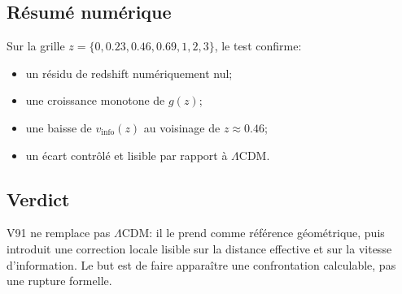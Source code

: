 \subsection{Résumé numérique}
Sur la grille $z=\{0,0.23,0.46,0.69,1,2,3\}$, le test confirme:
\begin{itemize}
    \item un résidu de redshift numériquement nul;
    \item une croissance monotone de $g(z)$;
    \item une baisse de $v_{\mathrm{info}}(z)$ au voisinage de $z\approx0.46$;
    \item un écart contrôlé et lisible par rapport à $\Lambda$CDM.
\end{itemize}

\subsection{Verdict}
V91 ne remplace pas $\Lambda$CDM: il le prend comme référence géométrique, puis introduit une correction locale lisible sur la distance effective et sur la vitesse d'information. Le but est de faire apparaître une confrontation calculable, pas une rupture formelle.